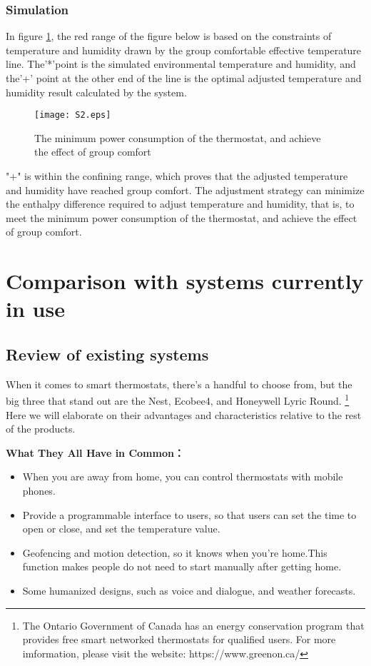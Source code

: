 \documentclass{mcmthesis}
\begin{document}
			\subsubsection{Simulation}	
				In figure \ref{fig:3}, the red range of the figure below is based on the constraints of temperature and humidity drawn by the group comfortable effective temperature line. The'*'point is the simulated environmental temperature and humidity, and the'+' point at the other end of the line is the optimal adjusted temperature and humidity result calculated by the system.
				
				\begin{figure}[h]
					\small
					\centering
					\texttt{[image: S2.eps]}
					\caption{The minimum power consumption of the thermostat, and achieve the effect of group comfort} \label{fig:3}
				\end{figure}
				
				"+" is within the confining range, which proves that the adjusted temperature and humidity have reached group comfort. The adjustment strategy can minimize the enthalpy difference required to adjust temperature and humidity, that is, to meet the minimum power consumption of the thermostat, and achieve the effect of group comfort. 
	
	\section{Comparison with systems currently in use}
		\subsection{Review of existing systems}
		
			When it comes to smart thermostats, there’s a handful to choose from, but the big three that stand out are the Nest, Ecobee4, and Honeywell Lyric Round.
			\footnote{The Ontario Government of Canada has an energy conservation program that provides free smart networked thermostats for qualified users. For more imformation, please visit the website: https://www.greenon.ca/}
			Here we will elaborate on their advantages and characteristics relative to the rest of the products.
			
			\textbf{What They All Have in Common：}
			
			\begin{itemize}
				\item When you are away from home, you can control thermostats with mobile phones.
				
				\item Provide a programmable interface to users, so that users can set the time to open or close, and set the temperature value.
				
				\item Geofencing and motion detection, so it knows when you’re home.This function makes people do not need to start manually after getting home.
				
				\item Some humanized designs, such as voice and dialogue, and weather forecasts.
			\end{itemize}
			
\end{document}
